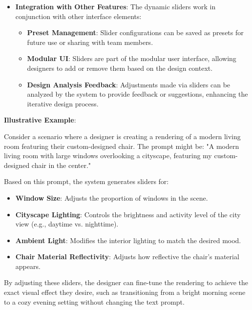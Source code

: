 \documentclass{article}
\begin{document}
\begin{itemize}
    \item \textbf{Integration with Other Features}: The dynamic sliders work in conjunction with other interface elements:

    \begin{itemize}
        \item \textbf{Preset Management}: Slider configurations can be saved as presets for future use or sharing with team members.
        \item \textbf{Modular UI}: Sliders are part of the modular user interface, allowing designers to add or remove them based on the design context.
        \item \textbf{Design Analysis Feedback}: Adjustments made via sliders can be analyzed by the system to provide feedback or suggestions, enhancing the iterative design process.
    \end{itemize}
\end{itemize}

\textbf{Illustrative Example}:

Consider a scenario where a designer is creating a rendering of a modern living room featuring their custom-designed chair. The prompt might be: "A modern living room with large windows overlooking a cityscape, featuring my custom-designed chair in the center."

Based on this prompt, the system generates sliders for:

\begin{itemize}
    \item \textbf{Window Size}: Adjusts the proportion of windows in the scene.
    \item \textbf{Cityscape Lighting}: Controls the brightness and activity level of the city view (e.g., daytime vs. nighttime).
    \item \textbf{Ambient Light}: Modifies the interior lighting to match the desired mood.
    \item \textbf{Chair Material Reflectivity}: Adjusts how reflective the chair's material appears.
\end{itemize}

By adjusting these sliders, the designer can fine-tune the rendering to achieve the exact visual effect they desire, such as transitioning from a bright morning scene to a cozy evening setting without changing the text prompt.
\end{document}
